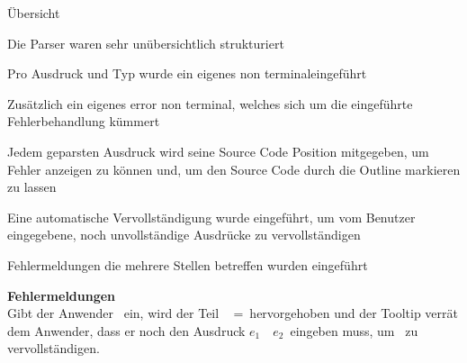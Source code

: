 {
  \begin{itemgroup}{Übersicht}
    \item Die Parser waren sehr unübersichtlich strukturiert
    \item Pro Ausdruck und Typ wurde ein eigenes \glqq non terminal\grqq eingeführt
    \item Zusätzlich ein eigenes \glqq error non terminal\grqq, welches sich um
          die eingeführte Fehlerbehandlung kümmert
    \item Jedem geparsten Ausdruck wird seine Source Code Position mitgegeben, um
          Fehler anzeigen zu können und, um den Source Code durch die Outline
          markieren zu lassen
    \item Eine automatische Vervollständigung wurde eingeführt, um vom Benutzer
          eingegebene, noch unvollständige Ausdrücke zu vervollständigen
    \item Fehlermeldungen die mehrere Stellen betreffen wurden eingeführt
  \end{itemgroup}
}

{
  {\bf Fehlermeldungen}\\[5mm]
  Gibt der Anwender \glqq {}\grqq\ 
  ein, wird der Teil \glqq \KeyLet\  =\grqq\ hervorgehoben und der Tooltip
  verrät dem Anwender, dass er noch den Ausdruck \glqq $e_1$\ \KeyIn\ $e_2$\grqq\ eingeben muss,
  um \glqq{\bf Let}\grqq\ zu vervollständigen.
}